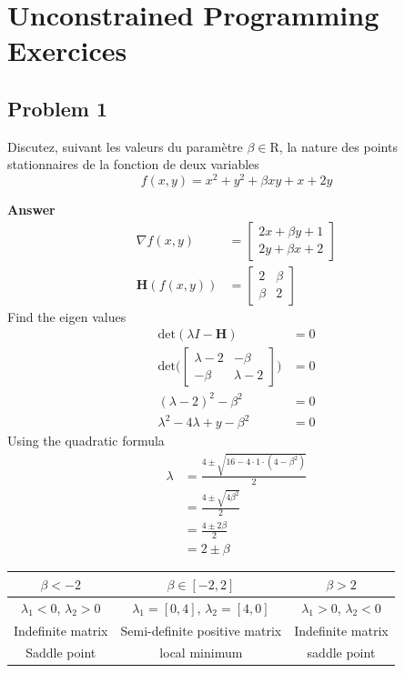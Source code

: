 \section{Unconstrained Programming Exercices}

\subsection{Problem 1}

Discutez, suivant les valeurs du paramètre $\beta \in \mathrm{R}$, la nature des points stationnaires de la fonction de deux variables
\[
f(x,y) = x^2 + y^2 + \beta xy + x + 2y
\]

\textbf{Answer}
\begin{align*}
\nabla f(x,y) &= 
	\begin{bmatrix}
		2x + \beta y + 1 \\
		2y + \beta x + 2
	\end{bmatrix} \\
\textbf{H}(f(x,y)) &=
	\begin{bmatrix}
		2 & \beta \\
		\beta & 2
	\end{bmatrix}
\end{align*}
Find the eigen values
\begin{align*}
\text{det}(\lambda I - \textbf{H}) &= 0 \\
\text{det}\Bigg( 
	\begin{bmatrix}
		\lambda -2 & -\beta \\
		-\beta & \lambda - 2
	\end{bmatrix}
\Bigg) &= 0 \\
(\lambda -2)^2 - \beta^2 &= 0 \\
\lambda^2 -4\lambda + y - \beta^2 &= 0
\end{align*}
Using the quadratic formula
\begin{align*}
\lambda &= \frac{4 \pm \sqrt{16 - 4 \cdot 1 \cdot (4-\beta^2)}}{2} \\
&= \frac{4 \pm \sqrt{4 \beta^2}}{2} \\
&= \frac{4 \pm 2\beta}{2} \\
&= 2 \pm \beta
\end{align*}

\begin{center}
\begin{tabular}{|c|c|c|}
	\hline
	$\beta < -2$ & $\beta \in [-2, 2]$ & $\beta > 2$ \\
	\hline
	$\lambda_1 < 0$, $\lambda_2 > 0$ & $\lambda_1 = [0, 4]$, $\lambda_2 = [4, 0]$& $\lambda_1 > 0$, $\lambda_2 < 0$\\
	Indefinite matrix & Semi-definite positive matrix & Indefinite matrix\\
	\hline
	Saddle point & local minimum & saddle point \\
	\hline
\end{tabular}
\end{center}

